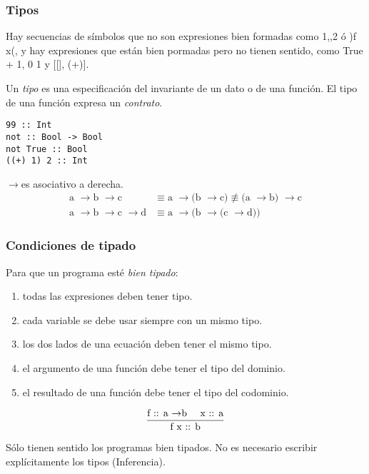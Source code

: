\documentclass[12pt]{extarticle}
\def\flecha{$\rightarrow$}
\def\ssspace{\space\space\space}
\begin{document}
\subsubsection{Tipos}
Hay secuencias de símbolos  que no son expresiones bien formadas como 1,,2 ó )f x(, y hay expresiones que están bien pormadas pero no tienen sentido, como True + 1, 0 1 y [[], (+)].

Un \textit{tipo} es una especificación del invariante de un dato o de una función. El tipo de una función expresa un \textit{contrato}.

\begin{verbatim}
99 :: Int
not :: Bool -> Bool
not True :: Bool
((+) 1) 2 :: Int
\end{verbatim}

\flecha es asociativo a derecha.
\begin{equation}
\begin{split}
\text{a \flecha b \flecha c} & \equiv \text{a \flecha (b \flecha c)} 
\not\equiv \text{(a \flecha b) \flecha c} \\
\text{a \flecha b \flecha c \flecha d} & \equiv \text{a \flecha (b \flecha (c \flecha d))}
\end{split}
\end{equation}

\subsubsection{Condiciones de tipado}
Para que un programa esté \textit{bien tipado}:

\begin{enumerate}
\itemsep-0.35em 
\item todas las expresiones deben tener tipo.
\item cada variable se debe usar siempre con un mismo tipo.
\item los dos lados de una ecuación deben tener el mismo tipo.
\item el argumento de una función debe tener el tipo del dominio.
\item el resultado de una función debe tener el tipo del codominio.
\end{enumerate}

\begin{equation}
\frac{\text{f :: a \flecha b \ssspace x :: a}}{\text{f x :: b}}
\end{equation}

Sólo tienen sentido los programas bien tipados.
No es necesario escribir explícitamente los tipos (Inferencia).
\end{document}
